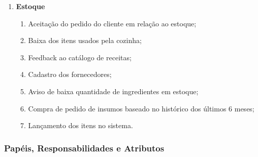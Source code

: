 \begin{enumerate}
\item \textbf{Estoque}

\begin{enumerate}
  \item Aceitação do pedido do cliente em relação ao estoque;
  \item Baixa dos itens usados pela cozinha;
  \item Feedback ao catálogo de receitas;
  \item Cadastro dos fornecedores;
  \item Aviso de baixa quantidade de ingredientes em estoque;
  \item Compra de pedido de insumos baseado no histórico dos últimos 6 meses;
  \item Lançamento dos itens no sistema.
\end{enumerate}
\end{enumerate}

\subsubsection{Papéis, Responsabilidades e Atributos}

